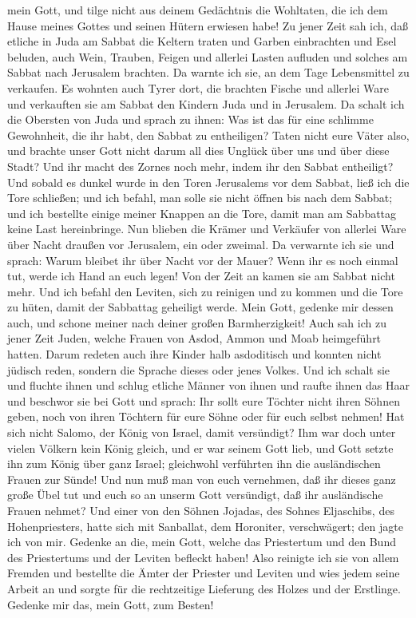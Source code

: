 mein Gott, und tilge nicht aus deinem Gedächtnis die Wohltaten, die ich
dem Hause meines Gottes und seinen Hütern erwiesen habe! 
Zu jener Zeit sah ich, daß etliche in Juda am Sabbat die Keltern traten
und Garben einbrachten und Esel beluden, auch Wein, Trauben, Feigen und
allerlei Lasten aufluden und solches am Sabbat nach Jerusalem brachten.
Da warnte ich sie, an dem Tage Lebensmittel zu verkaufen.
 Es wohnten auch Tyrer dort, die brachten Fische und
allerlei Ware und verkauften sie am Sabbat den Kindern Juda und in
Jerusalem.  Da schalt ich die Obersten von Juda und
sprach zu ihnen: Was ist das für eine schlimme Gewohnheit, die ihr habt,
den Sabbat zu entheiligen?  Taten nicht eure Väter also,
und brachte unser Gott nicht darum all dies Unglück über uns und über
diese Stadt? Und ihr macht des Zornes noch mehr, indem ihr den Sabbat
entheiligt?  Und sobald es dunkel wurde in den Toren
Jerusalems vor dem Sabbat, ließ ich die Tore schließen; und ich befahl,
man solle sie nicht öffnen bis nach dem Sabbat; und ich bestellte einige
meiner Knappen an die Tore, damit man am Sabbattag keine Last
hereinbringe.  Nun blieben die Krämer und Verkäufer von
allerlei Ware über Nacht draußen vor Jerusalem, ein oder zweimal.
 Da verwarnte ich sie und sprach: Warum bleibet ihr über
Nacht vor der Mauer? Wenn ihr es noch einmal tut, werde ich Hand an euch
legen! Von der Zeit an kamen sie am Sabbat nicht mehr. 
Und ich befahl den Leviten, sich zu reinigen und zu kommen und die Tore
zu hüten, damit der Sabbattag geheiligt werde. Mein Gott, gedenke mir
dessen auch, und schone meiner nach deiner großen Barmherzigkeit!
 Auch sah ich zu jener Zeit Juden, welche Frauen von
Asdod, Ammon und Moab heimgeführt hatten.  Darum redeten
auch ihre Kinder halb asdoditisch und konnten nicht jüdisch reden,
sondern die Sprache dieses oder jenes Volkes.  Und ich
schalt sie und fluchte ihnen und schlug etliche Männer von ihnen und
raufte ihnen das Haar und beschwor sie bei Gott und sprach: Ihr sollt
eure Töchter nicht ihren Söhnen geben, noch von ihren Töchtern für eure
Söhne oder für euch selbst nehmen!  Hat sich nicht
Salomo, der König von Israel, damit versündigt? Ihm war doch unter
vielen Völkern kein König gleich, und er war seinem Gott lieb, und Gott
setzte ihn zum König über ganz Israel; gleichwohl verführten ihn die
ausländischen Frauen zur Sünde!  Und nun muß man von euch
vernehmen, daß ihr dieses ganz große Übel tut und euch so an unserm Gott
versündigt, daß ihr ausländische Frauen nehmet?  Und
einer von den Söhnen Jojadas, des Sohnes Eljaschibs, des Hohenpriesters,
hatte sich mit Sanballat, dem Horoniter, verschwägert; den jagte ich von
mir.  Gedenke an die, mein Gott, welche das Priestertum
und den Bund des Priestertums und der Leviten befleckt haben!
 Also reinigte ich sie von allem Fremden und bestellte
die Ämter der Priester und Leviten und wies jedem seine Arbeit an
 und sorgte für die rechtzeitige Lieferung des Holzes und
der Erstlinge. Gedenke mir das, mein Gott, zum Besten!

